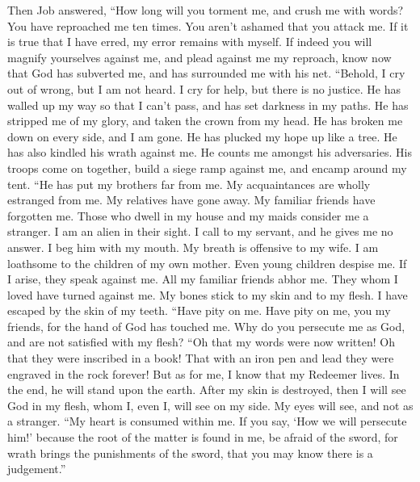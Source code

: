  Then Job answered,  ``How long will you
torment me, and crush me with words?  You have reproached
me ten times. You aren't ashamed that you attack me.  If
it is true that I have erred, my error remains with myself.
 If indeed you will magnify yourselves against me, and
plead against me my reproach,  know now that God has
subverted me, and has surrounded me with his net. 
``Behold, I cry out of wrong, but I am not heard. I cry for help, but
there is no justice.  He has walled up my way so that I
can't pass, and has set darkness in my paths.  He has
stripped me of my glory, and taken the crown from my head.
 He has broken me down on every side, and I am gone. He
has plucked my hope up like a tree.  He has also kindled
his wrath against me. He counts me amongst his adversaries.
 His troops come on together, build a siege ramp against
me, and encamp around my tent.  ``He has put my brothers
far from me. My acquaintances are wholly estranged from me.
 My relatives have gone away. My familiar friends have
forgotten me.  Those who dwell in my house and my maids
consider me a stranger. I am an alien in their sight.  I
call to my servant, and he gives me no answer. I beg him with my mouth.
 My breath is offensive to my wife. I am loathsome to the
children of my own mother.  Even young children despise
me. If I arise, they speak against me.  All my familiar
friends abhor me. They whom I loved have turned against me.
 My bones stick to my skin and to my flesh. I have
escaped by the skin of my teeth.  ``Have pity on me. Have
pity on me, you my friends, for the hand of God has touched me.
 Why do you persecute me as God, and are not satisfied
with my flesh?  ``Oh that my words were now written! Oh
that they were inscribed in a book!  That with an iron
pen and lead they were engraved in the rock forever!  But
as for me, I know that my Redeemer lives. In the end, he will stand upon
the earth.  After my skin is destroyed, then I will see
God in my flesh,  whom I, even I, will see on my side. My
eyes will see, and not as a stranger. ``My heart is consumed within me.
 If you say, `How we will persecute him!' because the
root of the matter is found in me,  be afraid of the
sword, for wrath brings the punishments of the sword, that you may know
there is a judgement.''

